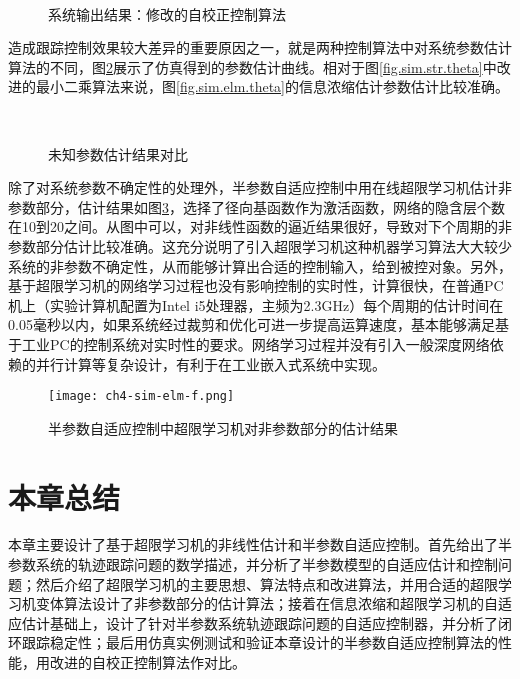 \begin{figure}[!htb]
	\centering
	\\
	\caption{系统输出结果：修改的自校正控制算法}
	\label{fig.sim.str.sys}
\end{figure}

造成跟踪控制效果较大差异的重要原因之一，就是两种控制算法中对系统参数估计算法的不同，图\ref{fig.sim.str.sys}展示了仿真得到的参数估计曲线。相对于图\ref{fig.sim.str.theta}中改进的最小二乘算法来说，图\ref{fig.sim.elm.theta}的信息浓缩估计参数估计比较准确。
\begin{figure}[!htb]
	\centering
	\\
	\caption{未知参数估计结果对比}
	\label{fig.sim.str.sys}
\end{figure}

除了对系统参数不确定性的处理外，半参数自适应控制中用在线超限学习机估计非参数部分，估计结果如图\ref{fig.sim.elm.f}，选择了径向基函数作为激活函数，网络的隐含层个数在10到20之间。从图中可以，对非线性函数的逼近结果很好，导致对下个周期的非参数部分估计比较准确。这充分说明了引入超限学习机这种机器学习算法大大较少系统的非参数不确定性，从而能够计算出合适的控制输入，给到被控对象。另外，基于超限学习机的网络学习过程也没有影响控制的实时性，计算很快，在普通PC机上（实验计算机配置为Intel i5处理器，主频为2.3GHz）每个周期的估计时间在0.05毫秒以内，如果系统经过裁剪和优化可进一步提高运算速度，基本能够满足基于工业PC的控制系统对实时性的要求。网络学习过程并没有引入一般深度网络依赖的并行计算等复杂设计，有利于在工业嵌入式系统中实现。
\begin{figure}[!htb]
  \centering
  \texttt{[image: ch4-sim-elm-f.png]}\\
  \caption{半参数自适应控制中超限学习机对非参数部分的估计结果}
  \label{fig.sim.elm.f}
\end{figure}

\section{本章总结}\label{sect:4.5}
本章主要设计了基于超限学习机的非线性估计和半参数自适应控制。首先给出了半参数系统的轨迹跟踪问题的数学描述，并分析了半参数模型的自适应估计和控制问题；然后介绍了超限学习机的主要思想、算法特点和改进算法，并用合适的超限学习机变体算法设计了非参数部分的估计算法；接着在信息浓缩和超限学习机的自适应估计基础上，设计了针对半参数系统轨迹跟踪问题的自适应控制器，并分析了闭环跟踪稳定性；最后用仿真实例测试和验证本章设计的半参数自适应控制算法的性能，用改进的自校正控制算法作对比。
